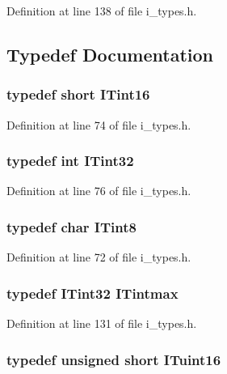 Definition at line 138 of file i\_\-types.h.

\subsection{Typedef Documentation}
\subsubsection{\setlength{\rightskip}{0pt plus 5cm}typedef short \bf{ITint16}}\label{i__types_8h_35d87c0529c387b12a66ed3c22033374}




Definition at line 74 of file i\_\-types.h.
\subsubsection{\setlength{\rightskip}{0pt plus 5cm}typedef int \bf{ITint32}}\label{i__types_8h_60bb51ad86750b972c4274c9d0d21c46}




Definition at line 76 of file i\_\-types.h.
\subsubsection{\setlength{\rightskip}{0pt plus 5cm}typedef char \bf{ITint8}}\label{i__types_8h_7265e2959bf1258f2902a628be49473b}




Definition at line 72 of file i\_\-types.h.
\subsubsection{\setlength{\rightskip}{0pt plus 5cm}typedef \bf{ITint32} \bf{ITintmax}}\label{i__types_8h_64ea548436e2aeaf4c8774af18e87770}




Definition at line 131 of file i\_\-types.h.
\subsubsection{\setlength{\rightskip}{0pt plus 5cm}typedef unsigned short \bf{ITuint16}}\label{i__types_8h_15d8afff2e6368f080543e43b99890c8}




